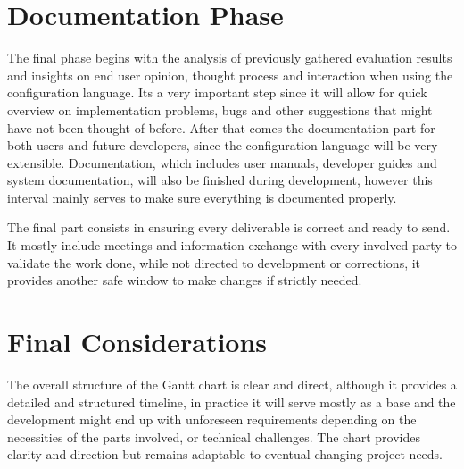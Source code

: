 \section{Documentation Phase}
\label{sec:dev_plan_doc}

The final phase begins with the analysis of previously gathered evaluation results and insights on end user opinion, thought process and interaction when using the configuration language. Its a very important step since it will allow for quick overview on implementation problems, bugs and other suggestions that might have not been thought of before. After that comes the documentation part for both users and future developers, since the configuration language will be very extensible. Documentation, which includes user manuals, developer guides and system documentation, will also be finished during development, however this interval mainly serves to make sure everything is documented properly.

The final part consists in ensuring every deliverable is correct and ready to send. It mostly include meetings and information exchange with every involved party to validate the work done, while not directed to development or corrections, it provides another safe window to make changes if strictly needed. 

\section{Final Considerations}
\label{sec:dev_plan_final}

The overall structure of the Gantt chart is clear and direct, although it provides a detailed and structured timeline, in practice it will serve mostly as a base and the development might end up with unforeseen requirements depending on the necessities of the parts involved, or technical challenges. The chart provides clarity and direction but remains adaptable to eventual changing project needs.
